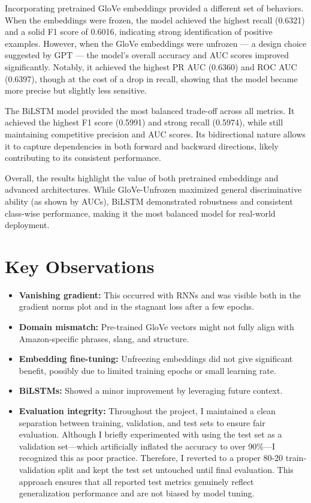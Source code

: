\documentclass[12pt]{article}
\begin{document}
Incorporating pretrained GloVe embeddings provided a different set of behaviors. When the embeddings were frozen, the model achieved the highest recall (0.6321) and a solid F1 score of 0.6016, indicating strong identification of positive examples. However, when the GloVe embeddings were unfrozen — a design choice suggested by GPT — the model's overall accuracy and AUC scores improved significantly. Notably, it achieved the highest PR AUC (0.6360) and ROC AUC (0.6397), though at the cost of a drop in recall, showing that the model became more precise but slightly less sensitive.

The BiLSTM model provided the most balanced trade-off across all metrics. It achieved the highest F1 score (0.5991) and strong recall (0.5974), while still maintaining competitive precision and AUC scores. Its bidirectional nature allows it to capture dependencies in both forward and backward directions, likely contributing to its consistent performance.

Overall, the results highlight the value of both pretrained embeddings and advanced architectures. While GloVe-Unfrozen maximized general discriminative ability (as shown by AUCs), BiLSTM demonstrated robustness and consistent class-wise performance, making it the most balanced model for real-world deployment.

\section{Key Observations}

\begin{itemize}
    \item \textbf{Vanishing gradient:} This occurred with RNNs and was visible both in the gradient norms plot and in the stagnant loss after a few epochs.
    \item \textbf{Domain mismatch:} Pre-trained GloVe vectors might not fully align with Amazon-specific phrases, slang, and structure.
    \item \textbf{Embedding fine-tuning:} Unfreezing embeddings did not give significant benefit, possibly due to limited training epochs or small learning rate.
    \item \textbf{BiLSTMs:} Showed a minor improvement by leveraging future context.
    \item \textbf{Evaluation integrity:} Throughout the project, I maintained a clean separation between training, validation, and test sets to ensure fair evaluation. Although I briefly experimented with using the test set as a validation set—which artificially inflated the accuracy to over 90\%—I recognized this as poor practice. Therefore, I reverted to a proper 80-20 train-validation split and kept the test set untouched until final evaluation. This approach ensures that all reported test metrics genuinely reflect generalization performance and are not biased by model tuning.

\end{itemize}
\end{document}
